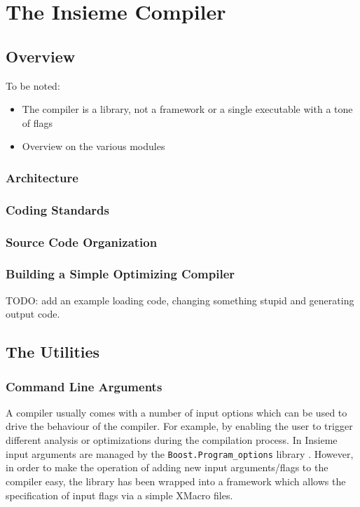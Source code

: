 \chapter{The Insieme Compiler} \label{cap:compiler}

\section{Overview}

To be noted:
\begin{itemize}
  \item The compiler is a library, not a framework or a single executable with a
  tone of flags
  \item Overview on the various modules
\end{itemize}

\subsection{Architecture}
\subsection{Coding Standards}
\subsection{Source Code Organization}
\subsection{Building a Simple Optimizing Compiler}
\label{cap:compiler:sec:overview:sub:building} TODO: add an example loading
code, changing something stupid and generating output code.

\section{The Utilities}
\subsection{Command Line Arguments}
\label{Command.Line.Args}

A compiler usually comes with a number of input options which can be used to
drive the behaviour of the compiler. For example, by enabling the user to
trigger different analysis or optimizations during the compilation process.
In Insieme input arguments are managed by the {\tt Boost.Program\_options}
library \cite{boost_program_options}. However, in order to make the operation of
adding new input arguments/flags to the compiler easy, the library has been
wrapped into a framework which allows the specification of input flags via a
simple XMacro files. 

